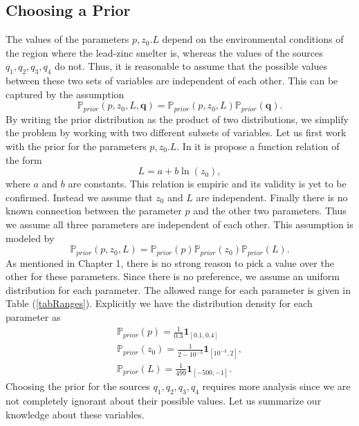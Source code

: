 \documentclass[12pt]{book}
\newcommand{\prior}{\mathbb{P}_{prior}}
\newcommand{\q}{\textbf{q}}
\newcommand{\pars}{p,z_{0},L}
\begin{document}
\subsection{Choosing a Prior}
The values of the  parameters $p,z_{0}.L$ depend on the environmental conditions of the region
where the lead-zinc smelter is, whereas
the values of the sources $q_{1},q_{2},q_{3},q_{4}$ do not. Thus, it is reasonable
to assume that the possible values between these two sets of variables are independent
of each other. This can be captured by the assumption
\begin{equation*} 
\prior(\pars,\q)=\prior(\pars)\prior(\q).
\end{equation*}
By writing the prior distribution as the product of two distributions, we 
simplify the problem by working with two different subsets of variables.
Let us first work with the prior for the parameters $p,z_{0}.L$. In \cite{seinfeld1998atmospheric}
it is propose a function relation of the form
\begin{equation*}
L=a+b\ln(z_{0}),
\end{equation*}
where $a$ and $b$ are constants. This relation is empiric and its validity is yet to be
confirmed. Instead we assume that $z_{0}$ and $L$ are independent. Finally
 there is no known connection between the parameter $p$ and the other two
parameters. Thus we assume all three parameters are independent of each other.
This assumption is  modeled by 
\begin{equation*}
\prior(p,z_{0},L)=\prior(p)\prior(z_{0})\prior(L).
\end{equation*}
As mentioned in Chapter 1, there is no strong reason to pick a value over the other 
for these parameters.
Since there is no preference, we assume an uniform
distribution for each parameter. The allowed range for each parameter is given
in Table (\ref{tabRanges}). Explicitly we have the  distribution
density for each parameter as
\begin{eqnarray}\label{eqnPriorparam}
\prior(p)=\frac{1}{0.3}\textbf{1}_{[0.1,0.4]}\nonumber\\
\prior(z_{0})=\frac{1}{2-10^{-3}}\textbf{1}_{[10^{-3},2]},\\
\prior(L)=\frac{1}{499}\textbf{1}_{[-500,-1]}\nonumber.
\end{eqnarray}
Choosing the prior for the sources $q_{1},q_{2},q_{3},q_{4}$ requires more
analysis since we are not completely ignorant about their possible values. 
Let us summarize our knowledge about these variables.
\end{document}
